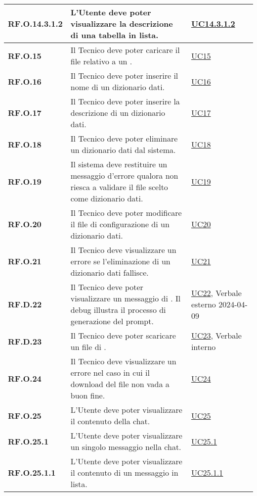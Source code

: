 \begin{adjustwidth}{-0.5cm}{-0.5cm}
\begin{longtable}{|P{3cm}|P{6,5cm}|>{\arraybackslash}P{4cm}|}
    \hline
    \textbf{RF.O.14.3.1.2} & L'Utente deve poter visualizzare la descrizione di una tabella in lista. & \hyperref[UC14point3point1point2]{UC14.3.1.2}\\
    \hline
    \textbf{RF.O.15} & Il Tecnico deve poter caricare il file relativo a un . & \hyperref[UC15]{UC15}\\
    \hline
    \textbf{RF.O.16} & Il Tecnico deve poter inserire il nome di un dizionario dati. & \hyperref[UC16]{UC16}\\
    \hline
    \textbf{RF.O.17} & Il Tecnico deve poter inserire la descrizione di un dizionario dati. & \hyperref[UC17]{UC17}\\
    \hline
    \textbf{RF.O.18} & Il Tecnico deve poter eliminare un dizionario dati dal sistema. & \hyperref[UC18]{UC18}\\
    \hline
    \textbf{RF.O.19} & Il sistema deve restituire un messaggio d'errore qualora non riesca a validare il file scelto come dizionario dati. & \hyperref[UC19]{UC19} \\
    \hline 
    \textbf{RF.O.20} & Il Tecnico deve poter modificare il file di configurazione di un dizionario dati. & \hyperref[UC20]{UC20} \\
    \hline
    \textbf{RF.O.21} & Il Tecnico deve visualizzare un errore se l'eliminazione di un dizionario dati fallisce. & \hyperref[21]{UC21}\\
    \hline
    \textbf{RF.D.22} & Il Tecnico deve poter visualizzare un messaggio di . Il debug illustra il processo di generazione del prompt. & \hyperref[22]{UC22}, Verbale esterno 2024-04-09 \\
    \hline
    \textbf{RF.D.23} & Il Tecnico deve poter scaricare un file di . & \hyperref[23]{UC23}, Verbale interno\\
    \hline
    \textbf{RF.O.24} & Il Tecnico deve visualizzare un errore nel caso in cui il download del file non vada a buon fine. &  \hyperref[UC24]{UC24}\\
    \hline
    \textbf{RF.O.25} & L'Utente deve poter visualizzare il contenuto della chat. &  \hyperref[UC25]{UC25}\\
    \hline
    \textbf{RF.O.25.1} & L'Utente deve poter visualizzare un singolo messaggio nella chat. &  \hyperref[UC25point1]{UC25.1}\\
    \hline
    \textbf{RF.O.25.1.1} & L'Utente deve poter visualizzare il contenuto di un messaggio in lista. & \hyperref[UC25point1point1]{UC25.1.1}\\

\end{longtable}
\end{adjustwidth}
